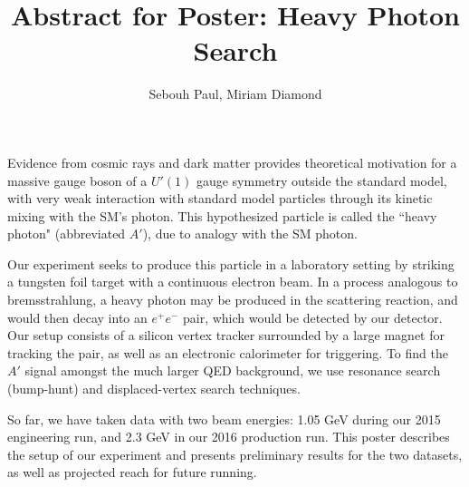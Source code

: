 \documentclass[11pt]{amsart}
\title{Abstract for Poster:  Heavy Photon Search}
\author{Sebouh Paul, Miriam Diamond}
\begin{document}
\maketitle
Evidence from cosmic rays and dark matter provides theoretical motivation for a massive gauge boson of a $U'(1)$ gauge symmetry outside the standard model, with very weak interaction with
standard model particles through its kinetic mixing with the SM's photon.  This hypothesized particle is called the ``heavy photon" (abbreviated $A'$), due to analogy with the SM photon.  

Our experiment seeks to produce this particle in a laboratory setting by striking a tungsten foil target with a continuous electron beam.  In a process analogous to bremsstrahlung, a heavy photon may be produced in the scattering reaction, and would then decay into an $e^+e^-$ pair, which would be detected by our detector.   Our setup consists of a silicon vertex tracker surrounded by a large magnet for tracking the pair, as well as an electronic calorimeter for triggering.  To find the $A'$ signal amongst the much larger QED background, we use resonance search (bump-hunt) and displaced-vertex search techniques.

So far, we have taken data with two beam energies: 1.05 GeV during our 2015 engineering run, and 2.3 GeV in our 2016 production run. This poster describes the setup of our experiment and presents preliminary results for the two datasets, as well as projected reach for future running.  
\end{document}
